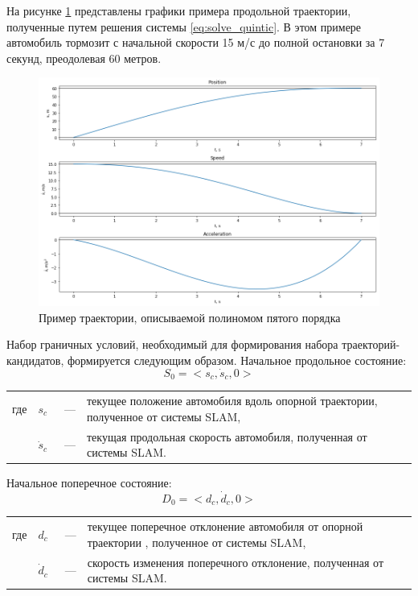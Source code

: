 На рисунке \ref{img:quntic_example} представлены графики примера продольной траектории, полученные путем решения
системы \ref{eq:solve_quintic}. В этом примере автомобиль тормозит с начальной скорости 15 м/с до полной остановки
за 7 секунд, преодолевая 60 метров.

\begin{figure}[h]
      \centering
      \includegraphics[width=\linewidth]{images/quintic_example}
      \caption{Пример траектории, описываемой полиномом пятого порядка}
      \label{img:quntic_example}
\end{figure}

Набор граничных условий, необходимый для формирования набора траекторий-кандидатов, формируется следующим образом.
Начальное продольное состояние:
\begin{equation}
      S_0 = <s_c, \dot{s}_c, 0>
\end{equation}
\noindent\begin{tabularx}{\linewidth}{lllX}
      где & $s_c$       &~---& текущее положение автомобиля вдоль опорной траектории, полученное от системы SLAM, \\
          & $\dot{s}_c$ &~---& текущая продольная скорость автомобиля, полученная от системы SLAM.
\end{tabularx}

Начальное поперечное состояние:
\begin{equation}
      D_0 = <d_c, \dot{d}_c, 0>
\end{equation}
\noindent\begin{tabularx}{\linewidth}{lllX}
      где & $d_c$       &~---& текущее поперечное отклонение автомобиля от опорной траектории , полученное от системы SLAM, \\
          & $\dot{d}_c$ &~---& скорость изменения поперечного отклонение, полученная от системы SLAM.
\end{tabularx}

